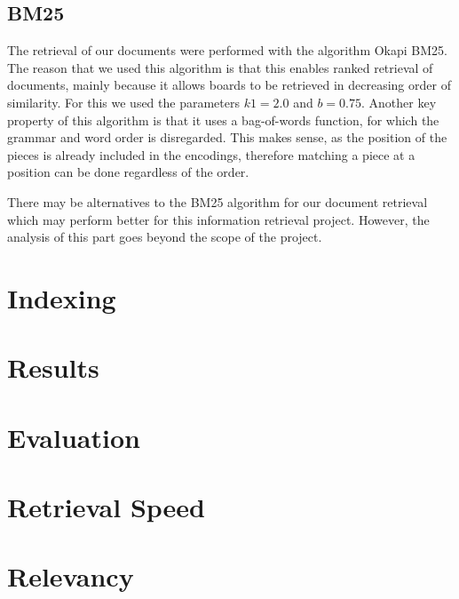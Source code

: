 \documentclass[11pt]{article}
\begin{document}
    \subsection{BM25}

    The retrieval of our documents were performed with the algorithm Okapi BM25. The reason that we used this algorithm is that this enables ranked retrieval of documents, mainly because it allows boards to be retrieved in decreasing order of similarity. For this we used the parameters $k1 = 2.0$ and $b = 0.75$. Another key property of this algorithm is that it uses a bag-of-words function, for which the grammar and word order is disregarded. This makes sense, as the position of the pieces is already included in the encodings, therefore matching a piece at a position can be done regardless of the order.


    There may be alternatives to the BM25 algorithm for our document retrieval which may perform better for this information retrieval project. However, the analysis of this part goes beyond the scope of the project.




    \section{Indexing}


    \section{Results}


    \section{Evaluation}


    \section{Retrieval Speed}


    \section{Relevancy}
\end{document}
